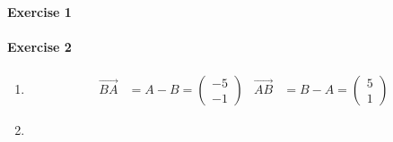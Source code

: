 \documentclass{article}
\begin{document}
\paragraph{Exercise 1}

\paragraph{Exercise 2}

\begin{enumerate}
    \item \begin{align*}
        \vec{BA} &= A - B = \begin{pmatrix}
            -5 \\ -1
        \end{pmatrix} &
        \vec{AB} &= B - A = \begin{pmatrix}
            5 \\ 1
        \end{pmatrix}
    \end{align*}

    \item \begin{center}
        \begin{tikzpicture}
            
        \end{tikzpicture}
    \end{center}
\end{enumerate}
\end{document}

